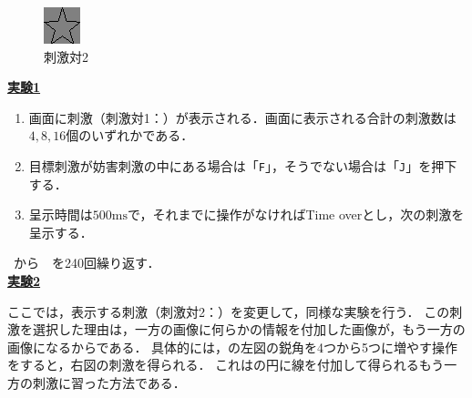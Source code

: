 \begin{figure}
\begin{minipage}[t]{.13\textwidth}
        \includegraphics[keepaspectratio,width=\textwidth]{../../13_BehavioralExperiment/star.png}
    \end{minipage}
    \caption{刺激対2}
    \label{fig:刺激対2}
    \vspace{-1cm}
\end{figure}
\noindent\textbf{\underline{実験1}}
\begin{enumerate}
    \renewcommand{\labelenumi}{\fbox{\theenumi}}
    \item 画面に刺激（刺激対1：）が表示される．画面に表示される合計の刺激数は\(4,8,16\)個のいずれかである．
    \item 目標刺激が妨害刺激の中にある場合は「\texttt{F}」，そうでない場合は「\texttt{J}」を押下する．
    \item 呈示時間は\(500\textrm{ms}\)で，それまでに操作がなければTime overとし，次の刺激を呈示する．
\end{enumerate}
\ から\ \ を240回繰り返す．\\
\textbf{\underline{実験2}}\par
ここでは，表示する刺激（刺激対2：）を変更して，同様な実験を行う．
この刺激を選択した理由は，一方の画像に何らかの情報を付加した画像が，もう一方の画像になるからである．
具体的には，の左図の鋭角を4つから5つに増やす操作をすると，右図の刺激を得られる．
これはの円に線を付加して得られるもう一方の刺激に習った方法である．
